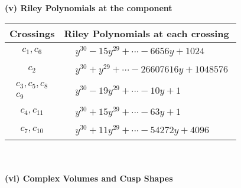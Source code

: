 \documentclass[1p]{elsarticle_modified}
\theoremstyle{definition}
\begin{document}
\newpage\renewcommand{\arraystretch}{1}
\flushleft \textbf{(v) Riley Polynomials at the component}\newline \\
\begin{tabular}{m{50pt}|m{274pt}}
Crossings & \hspace{64pt}Riley Polynomials at each crossing \\
\hline $$\begin{aligned}c_{1},c_{6}\end{aligned}$$&$\begin{aligned}
&y^{30}-15 y^{29}+\cdots-6656 y+1024
\end{aligned}$\\
\hline $$\begin{aligned}c_{2}\end{aligned}$$&$\begin{aligned}
&y^{30}+y^{29}+\cdots-26607616 y+1048576
\end{aligned}$\\
\hline $$\begin{aligned}c_{3},c_{5},c_{8}\\c_{9}\end{aligned}$$&$\begin{aligned}
&y^{30}-19 y^{29}+\cdots-10 y+1
\end{aligned}$\\
\hline $$\begin{aligned}c_{4},c_{11}\end{aligned}$$&$\begin{aligned}
&y^{30}+15 y^{29}+\cdots-63 y+1
\end{aligned}$\\
\hline $$\begin{aligned}c_{7},c_{10}\end{aligned}$$&$\begin{aligned}
&y^{30}+11 y^{29}+\cdots-54272 y+4096
\end{aligned}$\\
\hline
\end{tabular}\\~\\
\newpage\flushleft \textbf{(vi) Complex Volumes and Cusp Shapes}
\end{document}
